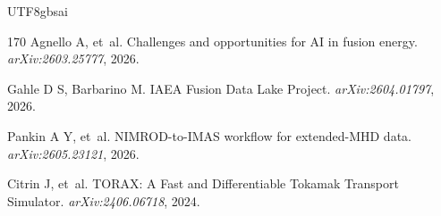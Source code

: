 \documentclass[12pt,a4paper]{article}
\begin{document}
\begin{CJK}{UTF8}{gbsai}
\begin{thebibliography}{170}
Agnello A, et~al.
\newblock Challenges and opportunities for AI in fusion energy.
\newblock \textit{arXiv:2603.25777}, 2026.

Gahle D S, Barbarino M.
\newblock IAEA Fusion Data Lake Project.
\newblock \textit{arXiv:2604.01797}, 2026.

Pankin A Y, et~al.
\newblock NIMROD-to-IMAS workflow for extended-MHD data.
\newblock \textit{arXiv:2605.23121}, 2026.

Citrin J, et~al.
\newblock TORAX: A Fast and Differentiable Tokamak Transport Simulator.
\newblock \textit{arXiv:2406.06718}, 2024.

\end{thebibliography}

\end{CJK}
\end{document}
